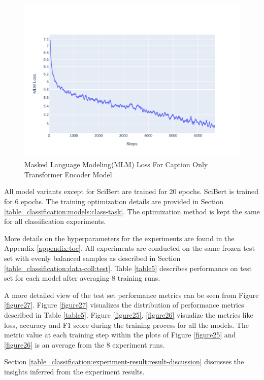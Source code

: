 \begin{figure}[h]
    \centering
    \includegraphics[width=\maxwidth{\textwidth}]{src/images/mlm-loss-comparison-caption.pdf}
    \caption{Masked Language Modeling(MLM) Loss For Caption Only Transformer Encoder Model }
    \label{figure\arabic{figurecounter}}
\end{figure}

All model variants except for SciBert are trained for 20 epochs. SciBert is trained for 6 epochs. The training optimization details are provided in Section \ref{table_classification:models:class-task}. The optimization method is kept the same for all classification experiments. 

More details on the hyperparameters for the experiments are found in the Appendix \ref{appendix:toc}. All experiments are conducted on the same frozen test set with evenly balanced samples as described in Section \ref{table_classification:data-coll:test}. Table \ref{table5} describes performance on test set for each model after averaging 8 training runs.

A more detailed view of the test set performance metrics can be seen from Figure \ref{figure27}. Figure \ref{figure27} visualizes the distribution of performance metrics described in Table \ref{table5}. Figure \ref{figure25}, \ref{figure26} visualize the metrics like loss, accuracy and F1 score during the training process for all the models. The metric value at each training step within the plots of Figure \ref{figure25} and \ref{figure26} is an average from the 8 experiment runs.

Section \ref{table_classification:experiment-result:result-discussion} discusses the insights inferred from the experiment results. 


